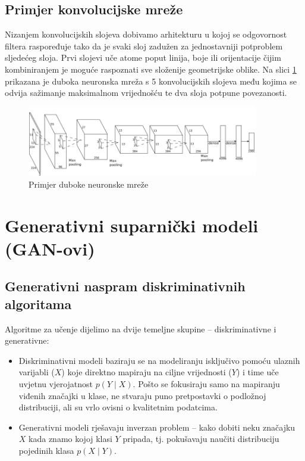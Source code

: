 \documentclass[lmodern, utf8, seminar]{fer}
\begin{document}
\section{Primjer konvolucijske mreže}
Nizanjem konvolucijskih slojeva dobivamo arhitekturu u kojoj se odgovornost filtera raspoređuje tako da je svaki sloj zadužen za jednostavniji potproblem sljedećeg sloja. Prvi slojevi uče atome poput linija, boje ili orijentacije čijim kombiniranjem je moguće raspoznati sve složenije geometrijske oblike. Na slici \ref{fig:dnn} prikazana je duboka neuronska mreža s 5 konvolucijskih slojeva među kojima se odvija sažimanje maksimalnom vrijednošću te dva sloja potpune povezanosti.
\newline

\begin{figure}[H]
    \centering
    \includegraphics[width=0.9\textwidth]{dnn}
    \caption{Primjer duboke neuronske mreže}
    \label{fig:dnn}
\end{figure}

\chapter{Generativni suparnički modeli (GAN-ovi)}
\section{Generativni naspram diskriminativnih algoritama}
Algoritme za učenje dijelimo na dvije temeljne skupine -- diskriminativne i generativne:
\newline

\renewcommand{\labelitemi}{\textbullet}
\begin{itemize} 
\item Diskriminativni modeli baziraju se na modeliranju isključivo pomoću ulaznih varijabli ($X$) koje direktno mapiraju na ciljne vrijednosti ($Y$) i time uče uvjetnu vjerojatnost $p(Y\mid X)$. Pošto se fokusiraju samo na mapiranju viđenih značajki u klase, ne stvaraju puno pretpostavki o podložnoj distribuciji, ali su vrlo ovisni o kvalitetnim podatcima.

\item Generativni modeli rješavaju inverzan problem -- kako dobiti neku značajku $X$ kada znamo kojoj klasi $Y$ pripada, tj. pokušavaju naučiti distribuciju pojedinih klasa $p(X\mid Y)$.
\newline
\end{itemize}
\end{document}
